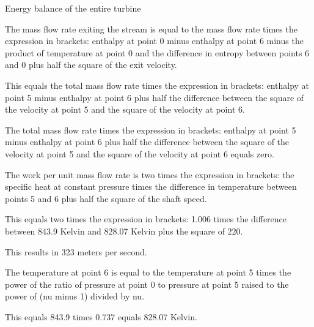 Energy balance of the entire turbine

The mass flow rate exiting the stream is equal to the mass flow rate times the expression in brackets: enthalpy at point 0 minus enthalpy at point 6 minus the product of temperature at point 0 and the difference in entropy between points 6 and 0 plus half the square of the exit velocity.

This equals the total mass flow rate times the expression in brackets: enthalpy at point 5 minus enthalpy at point 6 plus half the difference between the square of the velocity at point 5 and the square of the velocity at point 6.

The total mass flow rate times the expression in brackets: enthalpy at point 5 minus enthalpy at point 6 plus half the difference between the square of the velocity at point 5 and the square of the velocity at point 6 equals zero.

The work per unit mass flow rate is two times the expression in brackets: the specific heat at constant pressure times the difference in temperature between points 5 and 6 plus half the square of the shaft speed.

This equals two times the expression in brackets: 1.006 times the difference between 843.9 Kelvin and 828.07 Kelvin plus the square of 220.

This results in 323 meters per second.

The temperature at point 6 is equal to the temperature at point 5 times the power of the ratio of pressure at point 0 to pressure at point 5 raised to the power of (nu minus 1) divided by nu.

This equals 843.9 times 0.737 equals 828.07 Kelvin.